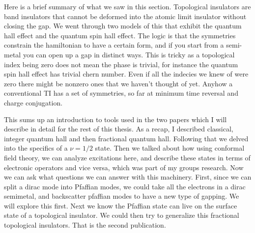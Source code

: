 Here is a brief summary of what we saw in this section. Topological insulators are band insulators that cannot be deformed into the atomic limit insulator without closing the gap. We went through two models of this that exhibit the quantum hall effect and the quantum spin hall effect. The logic is that the symmetries constrain the hamiltonian to have a certain form, and if you start from a semi-metal you can open up a gap in distinct ways. This is tricky as a topological index being zero does not mean the phase is trivial, for instance the quantum spin hall effect has trivial chern number. Even if all the indecies we knew of were zero there might be nonzero ones that we haven't thought of yet. Anyhow a conventional TI has a set of symmetries, so far at minimum time reversal and charge conjugation.
 
This sums up an introduction to tools used in the two papers which I will describe in detail for the rest of this thesis. As a recap, I described classical, integer quantum hall and then fractional quantum hall. Following that we delved into the specifics of a $\nu=1/2$ state. Then we talked about how using conformal field theory, we can analyze excitations here, and describe these states in terms of electronic operators and vice versa, which was part of my groups research. Now we can ask what questions we can answer with this machinery. First, since we can split a dirac mode into Pfaffian modes, we could take all the electrons in a dirac semimetal, and backscatter pfaffian modes to have a new type of gapping. We will explore this first. Next we know the Pfaffian state can live on the surface state of a topological insulator. We could then try to generalize this fractional topological insulators. That is the second publication.
 


